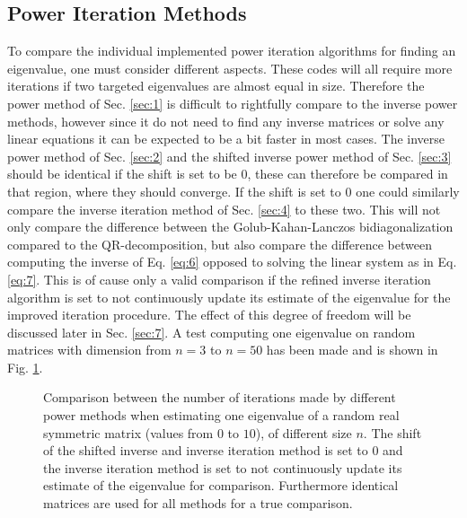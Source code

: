 \documentclass[twocolumn]{article}
\begin{document}
\subsection{\label{sec:6}Power Iteration Methods}
To compare the individual implemented power iteration algorithms for finding an eigenvalue, one must consider different aspects. These codes will all require more iterations if two targeted eigenvalues are almost equal in size. Therefore the power method of Sec. \ref{sec:1} is difficult to rightfully compare to the inverse power methods, however since it do not need to find any inverse matrices or solve any linear equations it can be expected to be a bit faster in most cases. The inverse power method of Sec. \ref{sec:2} and the shifted inverse power method of Sec. \ref{sec:3} should be identical if the shift is set to be $0$, these can therefore be compared in that region, where they should converge. If the shift is set to $0$ one could similarly compare the inverse iteration method of Sec. \ref{sec:4} to these two. This will not only compare the difference between the Golub-Kahan-Lanczos bidiagonalization compared to the QR-decomposition, but also compare the difference between computing the inverse of Eq. \eqref{eq:6} opposed to solving the linear system as in Eq. \eqref{eq:7}. This is of cause only a valid comparison if the refined inverse iteration algorithm is set to not continuously update its estimate of the eigenvalue for the improved iteration procedure. The effect of this degree of freedom will be discussed later in Sec. \ref{sec:7}. A test computing one eigenvalue on random matrices with dimension from $n=3$ to $n=50$ has been made and is shown in Fig. \ref{fig1}.

  \begin{figure}[h]

\caption{Comparison between the number of iterations made by different power methods when estimating one eigenvalue of a random real symmetric matrix (values from $0$ to $10$), of different size $n$. The shift of the shifted inverse and inverse iteration method is set to $0$ and the inverse iteration method is set to not continuously update its estimate of the eigenvalue for comparison. Furthermore identical matrices are used for all methods for a true comparison.}
\label{fig1}
\end{figure}
\end{document}
